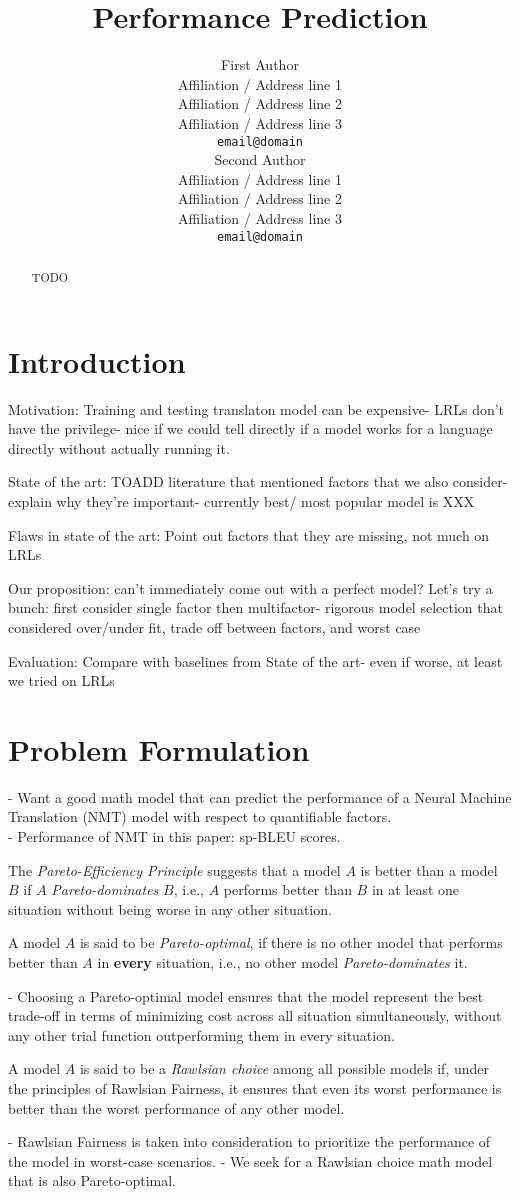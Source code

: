 \documentclass[11pt]{article}
\title{Performance Prediction}
\author{First Author \\
  Affiliation / Address line 1 \\
  Affiliation / Address line 2 \\
  Affiliation / Address line 3 \\
  \texttt{email@domain} \\\And
  Second Author \\
  Affiliation / Address line 1 \\
  Affiliation / Address line 2 \\
  Affiliation / Address line 3 \\
  \texttt{email@domain} \\}
\begin{document}
\maketitle
\begin{abstract}
TODO
\end{abstract}

\section{Introduction}
Motivation: Training and testing translaton model can be expensive- LRLs don't have the privilege- nice if we could tell directly if a model works for a language directly without actually running it.

State of the art: TOADD literature that mentioned factors that we also consider- explain why they're important- currently best/ most popular model is XXX

Flaws in state of the art: Point out factors that they are missing, not much on LRLs

Our proposition: can't immediately come out with a perfect model? Let's try a bunch: first consider single factor then multifactor- rigorous model selection that considered over/under fit, trade off between factors, and worst case

Evaluation: Compare with baselines from State of the art- even if worse, at least we tried on LRLs

\section{Problem Formulation}
- Want a good math model that can predict the performance of a Neural Machine Translation (NMT) model with respect to quantifiable factors. \\
- Performance of NMT in this paper: sp-BLEU scores.
\begin{definition}
    The \textit{Pareto-Efficiency Principle} suggests that a model $A$ is better than a model $B$ if $A$ \textit{Pareto-dominates} $B$, i.e., $A$ performs better than $B$ in at least one situation without being worse in any other situation.
\end{definition}
\begin{definition}
    A model $A$ is said to be \textit{Pareto-optimal}, if there is no other model that performs better than $A$ in \textbf{every} situation, i.e., no other model \textit{Pareto-dominates} it. 
\end{definition}
- Choosing a Pareto-optimal model ensures that the model represent the best trade-off in terms of minimizing cost across all situation simultaneously, without any other trial function outperforming them in every situation.
\begin{definition}
    A model $A$ is said to be a \textit{Rawlsian choice} among all possible models if, under the principles of Rawlsian Fairness, it ensures that even its worst performance is better than the worst performance of any other model.
\end{definition}
- Rawlsian Fairness is taken into consideration to prioritize the performance of the model in worst-case scenarios.
- We seek for a Rawlsian choice math model that is also Pareto-optimal. 
\end{document}
